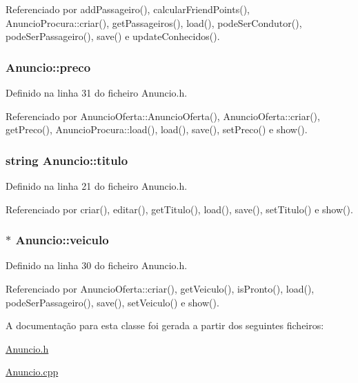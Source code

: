 Referenciado por add\+Passageiro(), calcular\+Friend\+Points(), Anuncio\+Procura\+::criar(), get\+Passageiros(), load(), pode\+Ser\+Condutor(), pode\+Ser\+Passageiro(), save() e update\+Conhecidos().

\hypertarget{class_anuncio_aa780fd8e07586a3af117fd20593fb1b4}{
\subsubsection[{preco}]{ Anuncio\+::preco\hspace{0.3cm}{\ttfamily [protected]}}}\label{class_anuncio_aa780fd8e07586a3af117fd20593fb1b4}


Definido na linha 31 do ficheiro Anuncio.\+h.



Referenciado por Anuncio\+Oferta\+::\+Anuncio\+Oferta(), Anuncio\+Oferta\+::criar(), get\+Preco(), Anuncio\+Procura\+::load(), load(), save(), set\+Preco() e show().

\hypertarget{class_anuncio_adb34bedd8220f42b9ee37662c21313e6}{
\subsubsection[{titulo}]{\setlength{\rightskip}{0pt plus 5cm}string Anuncio\+::titulo\hspace{0.3cm}{\ttfamily [protected]}}}\label{class_anuncio_adb34bedd8220f42b9ee37662c21313e6}


Definido na linha 21 do ficheiro Anuncio.\+h.



Referenciado por criar(), editar(), get\+Titulo(), load(), save(), set\+Titulo() e show().

\hypertarget{class_anuncio_a3cffe1ce2024500bddaf07bd0f7ecc81}{
\subsubsection[{veiculo}]{$\ast$ Anuncio\+::veiculo\hspace{0.3cm}{\ttfamily [protected]}}}\label{class_anuncio_a3cffe1ce2024500bddaf07bd0f7ecc81}


Definido na linha 30 do ficheiro Anuncio.\+h.



Referenciado por Anuncio\+Oferta\+::criar(), get\+Veiculo(), is\+Pronto(), load(), pode\+Ser\+Passageiro(), save(), set\+Veiculo() e show().



A documentação para esta classe foi gerada a partir dos seguintes ficheiros\+:\begin{DoxyCompactItemize}
\item 
\hyperlink{_anuncio_8h}{Anuncio.\+h}\item 
\hyperlink{_anuncio_8cpp}{Anuncio.\+cpp}\end{DoxyCompactItemize}
